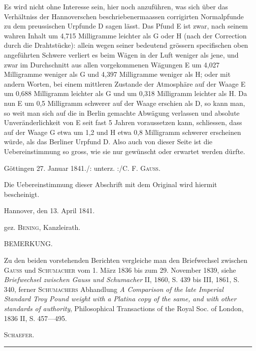 Es wird nicht ohne Interesse sein, hier noch anzuführen, was sich über
das Verhältniss der Hannoverschen beschriebenermaassen corrigirten Normalpfunde
zu dem preussischen Urpfunde D sagen lässt. Das Pfund E ist zwar,
nach seinem wahren Inhalt um 4,715 Milligramme leichter als G oder H
(nach der Correction durch die Drahtstücke): allein wegen seiner bedeutend
grössern specifischen oben angeführten Schwere verliert es beim Wägen in der
\clearpage{}
\noindent Luft weniger als jene, und zwar im Durchschnitt aus allen vorgekommenen
Wägungen E um 4,027 Milligramme weniger als G und 4,397 Milligramme
weniger als H; oder mit andern Worten, bei einem mittleren Zustande der
Atmosphäre  auf der Waage E um 0,688 Milligramm leichter als
G und um 0,318 Milligramm leichter als H. Da nun E um 0,5 Milligramm
schwerer auf der Waage erschien als D, so kann man, so weit man sich auf
die in Berlin gemachte Abwägung verlassen und absolute Unveränderlichkeit
von E seit fast 5 Jahren voraussetzen kann, schliessen, dass auf der Waage
G etwa um 1,2 und H etwa 0,8 Milligramm schwerer erscheinen würde,
als das Berliner Urpfund D. Also auch von dieser Seite ist die Uebereinstimmung
so gross, wie sie nur gewünscht oder erwartet werden dürfte.

\medskip
\noindent\hspace*{\parindent}Göttingen 27. Januar 1841.\hfill /: unterz. :/\quad C. F. \textsc{Gauss}.
\par\bigskip
\begin{flushright}\begin{minipage}{.66\textwidth}\small
\setlength{\parindent}{1.2em}
Die Uebereinstimmung dieser Abschrift mit dem Original wird hiermit bescheinigt.

\medskip Hannover, den 13. April 1841.
\begin{center}gez. \textsc{Bening}, Kanzleirath.\end{center}
\end{minipage}\end{flushright}
\bigskip
{\small
\begin{center}BEMERKUNG.\end{center}
\noindent\hspace*{\parindent}Zu den beiden vorstehenden Berichten vergleiche man den Briefwechsel zwischen \textsc{Gauss} und \textsc{Schumacher} vom 1. März 1836 bis zum 29. November 1839, siehe \textit{Briefwechsel zwischen Gauss und Schumacher} II, 1860, S. 439 bis III, 1861, S. 340, ferner \textsc{Schumachers} Abhandlung \textit{A Comparison of the late Imperial Standard Troy Pound weight with a Platina copy of the same, and with other standards of authority}, Philosophical Transactions of the Royal Soc. of London, 1836 II, S. 457—495.
\par\hfill\textsc{Schaefer}.
\par}
\begin{center}\rule{1.35in}{.35pt}\end{center}
\par\clearpage\endgroup
